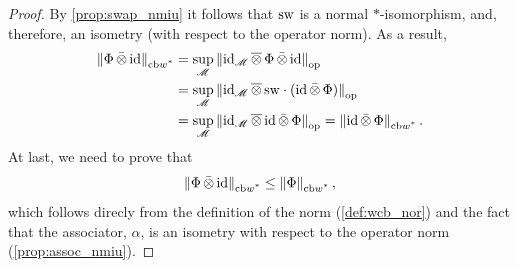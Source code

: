 \begin{proof}

By \autoref{prop:swap_nmiu} it follows that $\mathrm{sw}$ is a normal $\ast$-isomorphism, and, therefore, an isometry (with respect to the operator norm). As a result,
\begin{align*}
  \left\lVert \Phi \,\bar{\otimes} \, \mathrm{id} \right\rVert_{\text{cb$w^*$}} &= \sup_{\mathscr{M}} \left\lVert  \mathrm{id}_\mathscr{M} \, \overline{\otimes} \, \Phi \,\bar{\otimes} \, \mathrm{id} \right\rVert_{\text{op}} \\
  & =  \sup_{\mathscr{M}} \left\lVert  \mathrm{id}_\mathscr{M} \, \overline{\otimes} \,  \mathrm{sw} \cdot (\mathrm{id} \,\bar{\otimes} \,\Phi) \right\rVert_{\text{op}} \\
& = \sup_{\mathscr{M}} \left\lVert \mathrm{id}_\mathscr{M} \, \overline{\otimes} \,  \mathrm{id} \,\bar{\otimes} \,\Phi \right\rVert_{\text{op}}  = \left\lVert \mathrm{id} \,\bar{\otimes} \,\Phi \right\rVert_{\text{cb$w^*$}}. 
\end{align*}
At last, we need to prove that
\[
  \left\lVert \Phi \,\bar{\otimes} \, \mathrm{id} \right\rVert_{\text{cb$w^*$}} \leq \left\lVert \Phi \right\rVert_{\text{cb$w^*$}},
\]  
which follows direcly from the definition of the norm (\autoref{def:wcb_nor}) and the fact that the associator, $\alpha$, is an isometry with respect to the operator norm (\autoref{prop:assoc_nmiu}). 

\end{proof}

